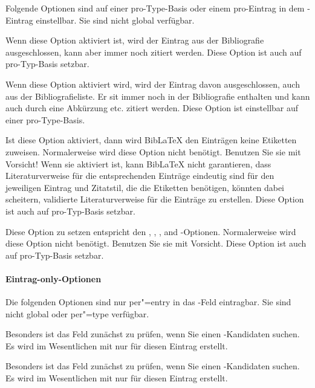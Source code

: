 \documentclass{ltxdockit}[2011/03/25]
\newcommand*{\biblatex}{BibLaTeX\xspace}
\begin{document}
Folgende Optionen sind auf einer pro-Type-Basis oder einem pro-Eintrag in dem
-Eintrag einstellbar. Sie sind nicht global verfügbar.

\begin{optionlist}


Wenn diese Option aktiviert ist, wird der Eintrag aus
der Bibliografie ausgeschlossen, kann aber immer noch zitiert werden.
Diese Option ist auch auf pro-Typ-Basis setzbar.


Wenn diese Option aktiviert wird, wird der Eintrag davon ausgeschlossen, auch aus der Bibliografieliste. Er sit immer noch in der Bibliografie enthalten und kann auch durch eine Abkürzung etc. zitiert werden. Diese Option ist einstellbar auf einer pro-Type-Basis.


Ist diese Option aktiviert, dann wird \biblatex
den Einträgen keine Etiketten zuweisen. Normalerweise wird diese Option nicht
benötigt. Benutzen Sie sie mit Vorsicht! Wenn sie aktiviert ist, kann
\biblatex nicht garantieren, dass Literaturverweise für die entsprechenden
Einträge eindeutig sind für den jeweiligen Eintrag und Zitatstil, die die Etiketten benötigen, 
könnten dabei scheitern, validierte Literaturverweise für die Einträge zu erstellen.
Diese Option ist auch auf pro-Typ-Basis setzbar.


Diese Option zu setzen entspricht den , , , and -Optionen. Normalerweise wird diese Option nicht benötigt. Benutzen Sie sie mit Vorsicht.
Diese Option ist auch auf pro-Typ-Basis setzbar.

\end{optionlist}

\paragraph{Eintrag-only-Optionen}
\label{use:opt:bib:entry}

Die folgenden Optionen sind nur per"=entry in das -Feld 
eintragbar.  Sie sind nicht global oder per"=type verfügbar.

\begin{optionlist}


Besonders ist das Feld zunächst zu prüfen, wenn Sie einen 
-Kandidaten suchen. Es wird im Wesentlichen 
mit  nur für diesen Eintrag erstellt.


Besonders ist das Feld zunächst zu prüfen, wenn Sie einen 
-Kandidaten suchen. Es wird im Wesentlichen 
mit  nur für diesen Eintrag erstellt.

\end{optionlist}
\end{document}
